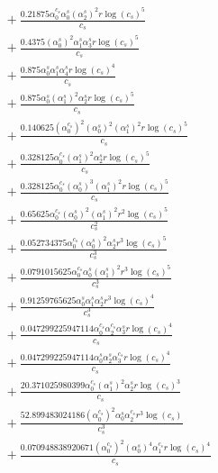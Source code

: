 \documentclass[10pt]{article}
\begin{document}
\begin{align*}
&{}  + \frac{0.21875 \alpha_{0}^{c_s} \alpha_{0}^s \left(\alpha_{2}^s\right)^{2} r \log{\left(c_{s} \right)}^{5}}{c_{s}} \\
&{}  + \frac{0.4375 \left(\alpha_{0}^s\right)^{2} \alpha_{1}^s \alpha_{3}^s r \log{\left(c_{s} \right)}^{5}}{c_{s}} \\
&{}  + \frac{0.875 \alpha_{0}^s \alpha_{1}^s \alpha_{4}^s r \log{\left(c_{s} \right)}^{4}}{c_{s}} \\
&{}  + \frac{0.875 \alpha_{0}^s \left(\alpha_{1}^s\right)^{2} \alpha_{2}^s r \log{\left(c_{s} \right)}^{5}}{c_{s}} \\
&{}  + \frac{0.140625 \left(\alpha_{0}^{c_s}\right)^{2} \left(\alpha_{0}^s\right)^{2} \left(\alpha_{1}^s\right)^{2} r \log{\left(c_{s} \right)}^{5}}{c_{s}} \\
&{}  + \frac{0.328125 \alpha_{0}^{c_s} \left(\alpha_{1}^s\right)^{2} \alpha_{2}^s r \log{\left(c_{s} \right)}^{5}}{c_{s}} \\
&{}  + \frac{0.328125 \alpha_{0}^{c_s} \left(\alpha_{0}^s\right)^{3} \left(\alpha_{1}^s\right)^{2} r \log{\left(c_{s} \right)}^{5}}{c_{s}} \\
&{}  + \frac{0.65625 \alpha_{0}^{c_s} \left(\alpha_{0}^s\right)^{2} \left(\alpha_{1}^s\right)^{2} r^{2} \log{\left(c_{s} \right)}^{5}}{c_{s}^{2}} \\
&{}  + \frac{0.052734375 \alpha_{0}^{c_s} \left(\alpha_{0}^s\right)^{2} \alpha_{2}^s r^{3} \log{\left(c_{s} \right)}^{5}}{c_{s}^{3}} \\
&{}  + \frac{0.0791015625 \alpha_{0}^{c_s} \alpha_{0}^s \left(\alpha_{1}^s\right)^{2} r^{3} \log{\left(c_{s} \right)}^{5}}{c_{s}^{3}} \\
&{}  + \frac{0.91259765625 \alpha_{0}^s \alpha_{1}^s \alpha_{2}^s r^{3} \log{\left(c_{s} \right)}^{4}}{c_{s}^{3}} \\
&{}  + \frac{0.047299225947114 \alpha_{0}^{c_s} \alpha_{2}^{c_s} \alpha_{3}^s r \log{\left(c_{s} \right)}^{4}}{c_{s}} \\
&{}  + \frac{0.047299225947114 \alpha_{0}^s \alpha_{2}^s \alpha_{3}^{c_s} r \log{\left(c_{s} \right)}^{4}}{c_{s}} \\
&{}  + \frac{20.371025980399 \alpha_{0}^{c_s} \left(\alpha_{1}^s\right)^{2} \alpha_{2}^s r \log{\left(c_{s} \right)}^{3}}{c_{s}} \\
&{}  + \frac{52.899483024186 \left(\alpha_{0}^{c_s}\right)^{2} \alpha_{0}^s \alpha_{2}^{c_s} r^{3} \log{\left(c_{s} \right)}}{c_{s}^{3}} \\
&{}  + \frac{0.070948838920671 \left(\alpha_{0}^{c_s}\right)^{2} \left(\alpha_{0}^s\right)^{4} \alpha_{1}^{c_s} r \log{\left(c_{s} \right)}^{4}}{c_{s}} \\

\end{align*}
\end{document}
